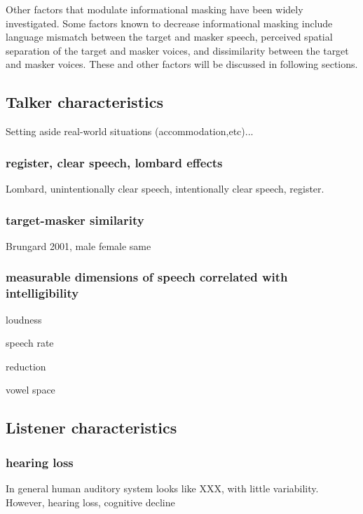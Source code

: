 Other factors that modulate informational masking have been widely investigated.  Some factors known to decrease informational masking include language mismatch between the target and masker speech,\citep{RhebergenEtAl2005, VanEngenBradlow2007, WuEtAl2011, BrouwerEtAl2012} perceived spatial separation of the target and masker voices,\citep{BrungartSimpson2002, FreymanEtAl1999, FreymanEtAl2004, KiddEtAl2005b, JohnstoneLitovsky2006} and dissimilarity between the target and masker voices.\citep{Brungart2001}  These and other factors will be discussed in following sections.

	
\subsection{Talker characteristics}
Setting aside real-world situations (accommodation,etc)...

\subsubsection{register, clear speech, lombard effects}
Lombard, unintentionally clear speech, intentionally clear speech, register.

\subsubsection{target-masker similarity}
Brungard 2001, male female same\citep{Brungart2001}

\subsubsection{measurable dimensions of speech correlated with intelligibility}
\begin{itm}
	\item{loudness}
	\item{speech rate}
	\item{reduction}
	\item{vowel space}
\end{itm}

\subsection{Listener characteristics}
\subsubsection{hearing loss}
In general human auditory system looks like XXX, with little variability.  However, hearing loss, cognitive decline

